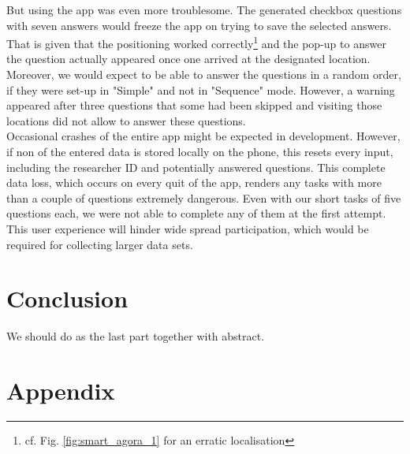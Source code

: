 \documentclass[letterpaper]{article}
\begin{document}
\indent But using the app was even more troublesome. The generated checkbox questions with seven answers would freeze the app on trying to save the selected answers. That is given that the positioning worked correctly\footnote{cf. Fig. \ref{fig:smart_agora_1} for an erratic localisation} and the pop-up to answer the question actually appeared once one arrived at the designated location. Moreover, we would expect to be able to answer the questions in a random order, if they were set-up in "Simple" and not in "Sequence" mode. However, a warning appeared after three questions that some had been skipped and visiting those locations did not allow to answer these questions.\\
\indent Occasional crashes of the entire app might be expected in development. However, if non of the entered data is stored locally on the phone, this resets every input, including the researcher ID and potentially answered questions. This complete data loss, which occurs on every quit of the app, renders any tasks with more than a couple of questions extremely dangerous. Even with our short tasks of five questions each, we were not able to complete any of them at the first attempt. This user experience will hinder wide spread participation, which would be required for collecting larger data sets.
\section{Conclusion}
We should do as the last part together with abstract.




\section{Appendix}
\end{document}
